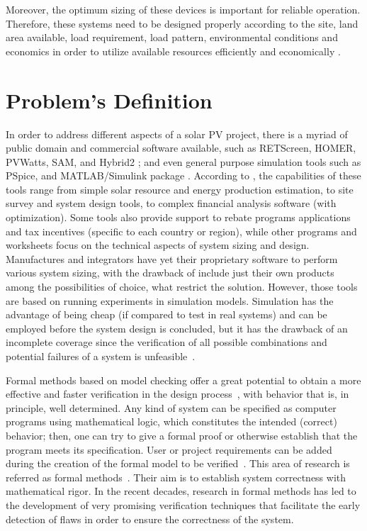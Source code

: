 Moreover, the optimum sizing of these devices is important for reliable operation. Therefore, these systems need to be designed properly according to the site, land area available, load requirement, load pattern, environmental conditions and economics in order to utilize available resources efficiently and economically \cite{Rawat}.

\section{Problem's Definition}

In order to address different aspects of a solar PV project, there is a myriad of public domain and commercial software available, such as RETScreen, HOMER, PVWatts, SAM, and Hybrid2 \cite{Pradhan,Swarnkar,NRELDobos,NRELBlair,Mills}; and even general purpose simulation tools such as PSpice, and MATLAB/Simulink package \cite{Gow1999,Benatiallah2017}. According to \cite{Brooks}, the capabilities of these tools range from simple solar resource and energy production estimation, to site survey and system design tools, to complex financial analysis software (with optimization). Some tools also provide support to rebate programs applications and tax incentives (specific to each country or region), while other programs and worksheets focus on the technical aspects of system sizing and design.  
%
Manufactures and integrators have yet their proprietary software to perform various system sizing, with the drawback of include just their own products among the possibilities of choice, what restrict the solution. 
%
However, those tools are based on running experiments in simulation models. Simulation has the advantage of being cheap (if compared to test in real systems) and can be employed before the system design is concluded, but it has the drawback of an incomplete coverage since the verification of all possible combinations and potential failures of a system is unfeasible~\cite{ClarkeHV18}.

Formal methods based on model checking offer a great potential to obtain a more effective and faster verification in the design process~\cite{ClarkeHV18}, with behavior that is, in principle, well determined. 
Any kind of system can be specified as computer programs using mathematical logic, which constitutes the intended (correct) behavior; then, one can try to give a formal proof or otherwise establish that the program meets its specification. User or project requirements can be added during the creation of the formal model to be verified~\cite{Trindade}. 
%
This area of research is referred as formal methods~\cite{Clarkeetal}. Their aim is to establish system correctness with mathematical rigor. 
In the recent decades, research in formal methods has led to the development of very promising verification techniques that facilitate the early detection of flaws in order to ensure the correctness of the system. 

